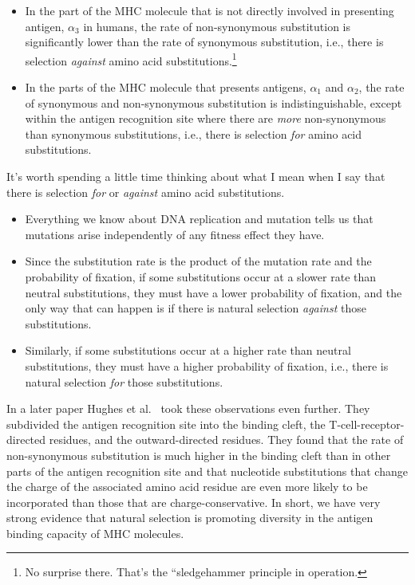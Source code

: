 \documentclass[12pt]{article}
\begin{document}
\begin{itemize}

\item In the part of the MHC molecule that is not directly involved in
  presenting antigen, $\alpha_3$ in humans, the rate of non-synonymous
  substitution is significantly lower than the rate of synonymous
  substitution, i.e., there is selection {\it against\/} amino acid
  substitutions.\footnote{No surprise there. That's the ``sledgehammer
    principle in operation.}

\item In the parts of the MHC molecule that presents antigens,
  $\alpha_1$ and $\alpha_2$, the rate of synonymous and non-synonymous
  substitution is indistinguishable, except within the antigen
  recognition site where there are {\it more\/} non-synonymous than
  synonymous substitutions, i.e., there is selection {\it for\/} amino
  acid substitutions.

\end{itemize}

\noindent It's worth spending a little time thinking about what I mean
when I say that there is selection {\it for\/} or {\it against\/}
amino acid substitutions.

\begin{itemize}

\item Everything we know about DNA replication and mutation tells us
  that mutations arise independently of any fitness effect they
  have.

\item Since the substitution rate is the product of the mutation rate
  and the probability of fixation, if some substitutions occur at a
  slower rate than neutral substitutions, they must have a lower
  probability of fixation, and the only way that can happen is if
  there is natural selection {\it against\/} those substitutions.

\item Similarly, if some substitutions occur at a higher rate than
  neutral substitutions, they must have a higher probability of
  fixation, i.e., there is natural selection {\it for\/} those
  substitutions. 

\end{itemize}

In a later paper Hughes et al.~\cite{Hughes-etal90} took these
observations even further. They subdivided the antigen recognition
site into the binding cleft, the T-cell-receptor-directed residues,
and the outward-directed residues. They found that the rate of
non-synonymous substitution is much higher in the binding cleft than
in other parts of the antigen recognition site and that nucleotide 
substitutions that change the charge of the associated amino acid
residue are even more likely to be incorporated than those that are
charge-conservative. In short, we have very strong evidence that
natural selection is promoting diversity in the antigen binding
capacity of MHC molecules.
\end{document}
